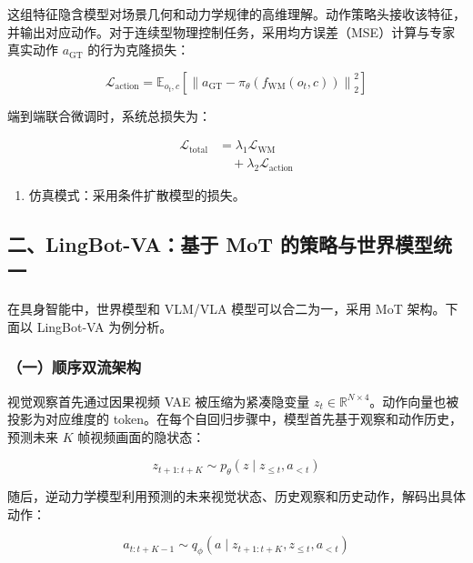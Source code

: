 这组特征隐含模型对场景几何和动力学规律的高维理解。动作策略头接收该特征，并输出对应动作。对于连续型物理控制任务，采用均方误差（MSE）计算与专家真实动作 \(a_{\mathrm{GT}}\) 的行为克隆损失：

\[
\mathcal{L}_{\mathrm{action}}
= \mathbb{E}_{o_t,c}
\left[
\left\|
a_{\mathrm{GT}} - \pi_\theta(f_{\mathrm{WM}}(o_t,c))
\right\|_2^2
\right]
\]

端到端联合微调时，系统总损失为：

\[
\begin{aligned}
\mathcal{L}_{\mathrm{total}}
&= \lambda_1 \mathcal{L}_{\mathrm{WM}}
\\
&\quad + \lambda_2 \mathcal{L}_{\mathrm{action}}
\end{aligned}
\]

\begin{enumerate}
\def\labelenumi{\arabic{enumi}.}
\setcounter{enumi}{2}
\tightlist
\item
  仿真模式：采用条件扩散模型的损失。
\end{enumerate}

\hypertarget{ux4e8clingbot-vaux57faux4e8e-mot-ux7684ux7b56ux7565ux4e0eux4e16ux754cux6a21ux578bux7edfux4e00}{%
\subsection{二、LingBot-VA：基于 MoT 的策略与世界模型统一}\label{ux4e8clingbot-vaux57faux4e8e-mot-ux7684ux7b56ux7565ux4e0eux4e16ux754cux6a21ux578bux7edfux4e00}}

在具身智能中，世界模型和 VLM/VLA 模型可以合二为一，采用 MoT 架构。下面以 LingBot-VA 为例分析。

\hypertarget{ux4e00ux987aux5e8fux53ccux6d41ux67b6ux6784}{%
\subsubsection{（一）顺序双流架构}\label{ux4e00ux987aux5e8fux53ccux6d41ux67b6ux6784}}

视觉观察首先通过因果视频 VAE 被压缩为紧凑隐变量 \(z_t \in \mathbb{R}^{N \times 4}\)。动作向量也被投影为对应维度的 token。在每个自回归步骤中，模型首先基于观察和动作历史，预测未来 \(K\) 帧视频画面的隐状态：

\[
z_{t+1:t+K} \sim p_\theta(z \mid z_{\le t}, a_{\lt t})
\]

随后，逆动力学模型利用预测的未来视觉状态、历史观察和历史动作，解码出具体动作：

\[
a_{t:t+K-1} \sim q_\phi(a \mid z_{t+1:t+K}, z_{\le t}, a_{\lt t})
\]


